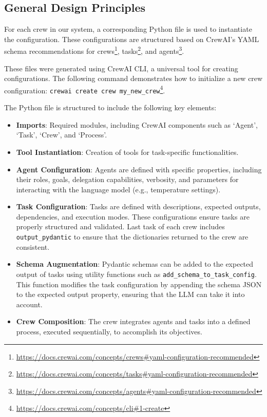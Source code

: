 \subsection{General Design Principles}
\label{subsec:design_principles}

For each crew in our system, a corresponding Python file is used to instantiate the configuration. These configurations are structured based on CrewAI's YAML schema recommendations for crews\footnote{\url{https://docs.crewai.com/concepts/crews#yaml-configuration-recommended}}, tasks\footnote{\url{https://docs.crewai.com/concepts/tasks#yaml-configuration-recommended}}, and agents\footnote{\url{https://docs.crewai.com/concepts/agents\#yaml-configuration-recommended}}.

These files were generated using CrewAI CLI, a universal tool for creating configurations. The following command demonstrates how to initialize a new crew configuration:\newline
\texttt{crewai create crew my\_new\_crew}\footnote{\url{https://docs.crewai.com/concepts/cli\#1-create}}.

The Python file is structured to include the following key elements:

\begin{itemize}
    \item \textbf{Imports}: Required modules, including CrewAI components such as `Agent', `Task', `Crew', and `Process'.
    \item \textbf{Tool Instantiation}: Creation of tools for task-specific functionalities.
    \item \textbf{Agent Configuration}: Agents are defined with specific properties, including their roles, goals, delegation capabilities, verbosity, and parameters for interacting with the language model (e.g., temperature settings).
    \item \textbf{Task Configuration}: Tasks are defined with descriptions, expected outputs, dependencies, and execution modes. These configurations ensure tasks are properly structured and validated. Last task of each crew includes \texttt{output\_pydantic} to ensure that the dictionaries returned to the crew are consistent.
    \item \textbf{Schema Augmentation}: Pydantic schemas can be added to the expected output of tasks using utility functions such as \texttt{add\_schema\_to\_task\_config}. This function modifies the task configuration by appending the schema JSON to the expected output property, ensuring that the LLM can take it into account.
    \item \textbf{Crew Composition}: The crew integrates agents and tasks into a defined process, executed sequentially, to accomplish its objectives.
\end{itemize}


